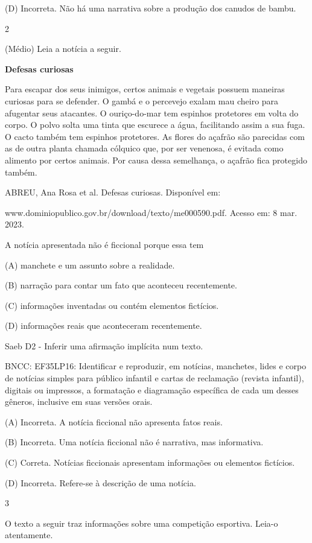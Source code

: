 \begin{itemize}
{{{\begin{itemize}
\begin{itemize}
\begin{itemize}
(D) Incorreta. Não há uma narrativa sobre a produção dos canudos de
bambu.

\num{2}

(Médio) Leia a notícia a seguir.

\textbf{Defesas curiosas}

Para escapar dos seus inimigos, certos animais e vegetais possuem
maneiras curiosas para se defender. O gambá e o percevejo exalam mau
cheiro para afugentar seus atacantes. O ouriço-do-mar tem espinhos
protetores em volta do corpo. O polvo solta uma tinta que escurece a
água, facilitando assim a sua fuga. O cacto também tem espinhos
protetores. As flores do açafrão são parecidas com as de outra planta
chamada cólquico que, por ser venenosa, é evitada como alimento por
certos animais. Por causa dessa semelhança, o açafrão fica protegido
também.

ABREU, Ana Rosa et al. Defesas curiosas. Disponível em:

www.dominiopublico.gov.br/download/texto/me000590.pdf. Acesso em: 8 mar.
2023.

A notícia apresentada não é ficcional porque essa tem

(A) manchete e um assunto sobre a realidade.

(B) narração para contar um fato que aconteceu recentemente.

(C) informações inventadas ou contém elementos fictícios.

(D) informações reais que aconteceram recentemente.

Saeb D2 - Inferir uma afirmação implícita num texto.

BNCC: EF35LP16: Identificar e reproduzir, em notícias, manchetes, lides
e corpo de notícias simples para público infantil e cartas de reclamação
(revista infantil), digitais ou impressos, a formatação e diagramação
específica de cada um desses gêneros, inclusive em suas versões orais.

(A) Incorreta. A notícia ficcional não apresenta fatos reais.

(B) Incorreta. Uma notícia ficcional não é narrativa, mas informativa.

(C) Correta. Notícias ficcionais apresentam informações ou elementos
fictícios.

(D) Incorreta. Refere-se à descrição de uma notícia.

\num{3}

O texto a seguir traz informações sobre uma competição esportiva. Leia-o
atentamente.


\end{itemize}
\end{itemize}
\end{itemize}}}}
\end{itemize}
